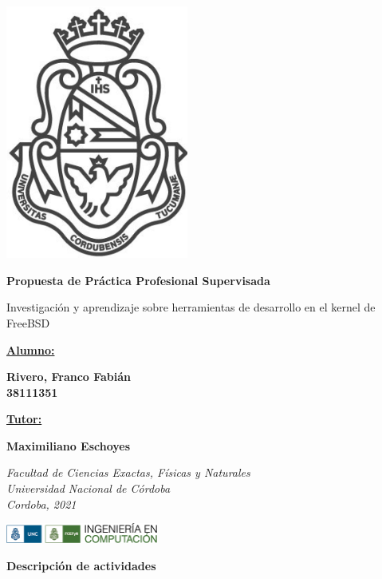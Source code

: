 \documentclass[a4paper, 15pt]{article}
\begin{document}
\begin{titlepage}
   \begin{center}
   \includegraphics[width=6cm]{recursos/logo_UNC}
   
   \Huge
   \textbf{Propuesta de Práctica Profesional Supervisada}
   
   \vspace{0.5cm}
   \LARGE
   Investigación y aprendizaje sobre herramientas de desarrollo en el kernel de FreeBSD

   \vspace{0.5cm}
   \Large
   \underline{\textbf{Alumno:}}
   
   \textbf{Rivero, Franco Fabián \\38111351}
   \vspace{0.2cm}
   
   \underline{\textbf{Tutor:}}
   
   \textbf{Maximiliano Eschoyes}
   
   \vspace{0.5cm}
   
   \textit{Facultad de Ciencias Exactas, Físicas y Naturales}\\
   \textit{Universidad Nacional de Córdoba}\\
   \textit{Cordoba, 2021}
   
   \vspace{1.4cm}
   
   \includegraphics[width=5cm]{recursos/logo}
\end{center}  
\end{titlepage}
\huge
\textbf{Descripción de actividades}
\end{document}
